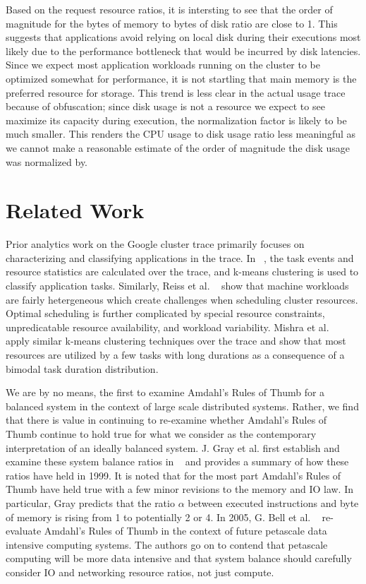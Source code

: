 \documentclass{sig-alternate}
\begin{document}
Based on the request resource ratios, it is intersting to see that the order of magnitude for the bytes of memory to bytes of disk ratio are close to 1.
This suggests that applications avoid relying on local disk during their executions most likely due to the performance bottleneck that would be incurred by disk latencies.
Since we expect most application workloads running on the cluster to be optimized somewhat for performance, it is not startling that main memory is the preferred resource for storage.
This trend is less clear in the actual usage trace because of obfuscation; since disk usage is not a resource we expect to see maximize its capacity during execution, the normalization factor is likely to be much smaller.
This renders the CPU usage to disk usage ratio less meaningful as we cannot make a reasonable estimate of the order of magnitude the disk usage was normalized by.

\section{Related Work}

Prior analytics work on the Google cluster trace primarily focuses on characterizing and classifying applications in the trace.
In ~\cite{clusterdata:Di2013}, the task events and resource statistics are calculated over the trace, and k-means clustering is used to classify application tasks.
Similarly, Reiss et al. ~\cite{clusterdata:Reiss2012b} show that machine workloads are fairly hetergeneous which create challenges when scheduling cluster resources.
Optimal scheduling is further complicated by special resource constraints, unpredicatable resource availability, and workload variability.
Mishra et al. ~\cite{clusterdata:Mishra2010} apply similar k-means clustering techniques over the trace and show that most resources are utilized by a few tasks with long durations as a consequence of a bimodal task duration distribution.

We are by no means, the first to examine Amdahl's Rules of Thumb for a balanced system in the context of large scale distributed systems.
Rather, we find that there is value in continuing to re-examine whether Amdahl's Rules of Thumb continue to hold true for what we consider as the contemporary interpretation of an ideally balanced system.
J. Gray et al. first establish and examine these system balance ratios in ~\cite{export:68636} and provides a summary of how these ratios have held in 1999.
It is noted that for the most part Amdahl's Rules of Thumb have held true with a few minor revisions to the memory and IO law.
In particular, Gray predicts that the ratio $\alpha$ between executed instructions and byte of memory is rising from 1 to potentially 2 or 4.
In 2005, G. Bell et al. ~\cite{Bell:2006:PCS:1110638.1110681} re-evaluate Amdahl's Rules of Thumb in the context of future petascale data intensive computing systems.
The authors go on to contend that petascale computing will be more data intensive and that system balance should carefully consider IO and networking resource ratios, not just compute.
\end{document}
